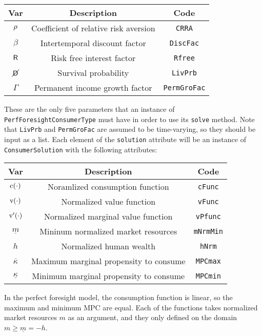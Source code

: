 \documentclass[12pt,titlepage,letterpaper]{econtex}
\begin{document}
\begin{table}[h!]
\centering
\begin{tabular}{c c c}
Var & Description & Code \\
\hline
$\rho$ & Coefficient of relative risk aversion & \texttt{CRRA} \\
$\beta$ & Intertemporal discount factor & \texttt{DiscFac} \\
$\mathsf{R}$ & Risk free interest factor & \texttt{Rfree} \\
$\cancel{\mathsf{D}}$ & Survival probability & \texttt{LivPrb} \\
$\Gamma$ & Permanent income growth factor & \texttt{PermGroFac}
\end{tabular}
\end{table}

These are the only five parameters that an instance of \texttt{PerfForesightConsumerType} must have in order to use its \texttt{solve} method.  Note that \texttt{LivPrb} and \texttt{PermGroFac} are assumed to be time-varying, so they should be input as a list.  Each element of the \texttt{solution} attribute will be an instance of \texttt{ConsumerSolution} with the following attributes:

\begin{table}[h!]
\centering
\begin{tabular}{c c c}
Var & Description & Code \\
\hline
$\mathrm{c}(\cdot)$ & Noramlized consumption function & \texttt{cFunc} \\
$\mathrm{v}(\cdot)$ & Normalized value function & \texttt{vFunc} \\
$\mathrm{v}'(\cdot)$ & Normalized marginal value function & \texttt{vPfunc} \\
$\underline{m}$ & Mininum normalized market resources & \texttt{mNrmMin} \\
$h$ & Normalized human wealth & \texttt{hNrm} \\
$\overline{\kappa}$ & Maximum marginal propensity to consume & \texttt{MPCmax} \\
$\underline{\kappa}$ & Minimum marginal propensity to consume & \texttt{MPCmin} \\
\end{tabular}
\end{table}
In the perfect foresight model, the consumption function is linear, so the maximum and minimum MPC are equal.  Each of the functions takes normalized market resources $m$ as an argument, and they only defined on the domain $m \geq \underline{m} = -h$.
\end{document}
